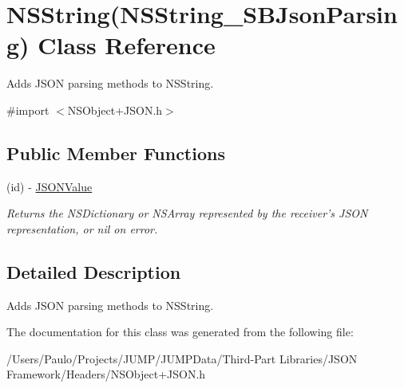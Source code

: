 \hypertarget{interface_n_s_string_07_n_s_string___s_b_json_parsing_08}{
\section{NSString(NSString\_\-SBJsonParsing) Class Reference}
\label{interface_n_s_string_07_n_s_string___s_b_json_parsing_08}
}


Adds JSON parsing methods to NSString.  




{\ttfamily \#import $<$NSObject+JSON.h$>$}

\subsection*{Public Member Functions}
\begin{DoxyCompactItemize}
\item 
\hypertarget{interface_n_s_string_07_n_s_string___s_b_json_parsing_08_aa2bafda5aa117ed2f02b1bdfe751b5aa}{
(id) -\/ \hyperlink{interface_n_s_string_07_n_s_string___s_b_json_parsing_08_aa2bafda5aa117ed2f02b1bdfe751b5aa}{JSONValue}}
\label{interface_n_s_string_07_n_s_string___s_b_json_parsing_08_aa2bafda5aa117ed2f02b1bdfe751b5aa}

\begin{DoxyCompactList}\small\item\em Returns the NSDictionary or NSArray represented by the receiver's JSON representation, or nil on error. \item\end{DoxyCompactList}\end{DoxyCompactItemize}


\subsection{Detailed Description}
Adds JSON parsing methods to NSString. 

The documentation for this class was generated from the following file:\begin{DoxyCompactItemize}
\item 
/Users/Paulo/Projects/JUMP/JUMPData/Third-\/Part Libraries/JSON Framework/Headers/NSObject+JSON.h\end{DoxyCompactItemize}
